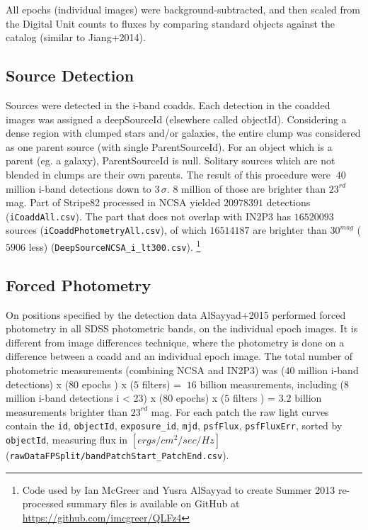 \documentclass[fleqn,usenatbib]{mnras}  %
\begin{document}
All epochs (individual images) were background-subtracted, and then scaled from the Digital Unit counts to fluxes by comparing standard objects against the \citep{ivezic2007} catalog  (similar to  Jiang+2014).   

\subsection{Source Detection}
Sources were detected in the i-band coadds. Each detection in the coadded images was assigned a deepSourceId (elsewhere called objectId). Considering  a dense region with clumped stars and/or galaxies, the entire clump was considered as one parent source (with single ParentSourceId). For an object which is a parent (eg. a galaxy), ParentSourceId is null. Solitary sources which are not blended  in clumps are their own parents. The result of this procedure were $~40$ million  i-band detections down to $3 \, \sigma$.  $8$ million of those are brighter than $23^{rd}$ mag. Part of Stripe82 processed in NCSA yielded  $20978391$ detections (\verb|iCoaddAll.csv|). The part that does not overlap with IN2P3 has   $16520093$ sources (\verb|iCoaddPhotometryAll.csv|), of which  $16514187$ are brighter than $30^{mag}$  ($5906$ less) (\verb|DeepSourceNCSA_i_lt300.csv|). \footnote{Code used by Ian McGreer and Yusra AlSayyad to create Summer 2013 re-processed summary files is available on GitHub at \url{https://github.com/imcgreer/QLFz4}}

\subsection{Forced Photometry}
On positions specified by the detection data AlSayyad+2015 performed forced photometry in all SDSS photometric bands, on the individual epoch images. It is different from image differences technique, where the photometry is done on a difference between a coadd and an individual epoch image.  The total number of photometric measurements (combining NCSA and IN2P3) was  ($40$  million i-band detections) x ($80$ epochs ) x ($5$ filters) = $~16$ billion measurements, including   ($8$ million i-band detections i < 23) x ($80$ epochs) x ($5$ filters ) = $3.2$ billion measurements brighter than $23^{rd}$ mag.
For each patch the raw light curves contain the \verb|id|, \verb|objectId|, \verb|exposure_id|, \verb|mjd|, \verb|psfFlux|, \verb|psfFluxErr|, sorted by \verb|objectId|, measuring flux in $[ergs/ cm^{2} / sec / Hz]$ (\verb|rawDataFPSplit/bandPatchStart_PatchEnd.csv|). 
\end{document}
